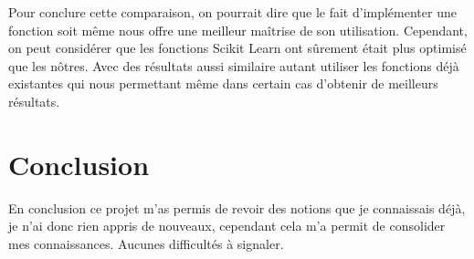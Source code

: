 \documentclass[french]{article}
\begin{document}
Pour conclure cette comparaison, on pourrait dire que le fait d'implémenter une fonction soit même nous offre une meilleur maîtrise de son utilisation. Cependant, on peut considérer que les fonctions Scikit Learn ont sûrement était plus optimisé que les nôtres. Avec des résultats aussi similaire autant utiliser les fonctions déjà existantes qui nous permettant même dans certain cas d'obtenir de meilleurs résultats.

\section{Conclusion}

En conclusion ce projet m'as permis de revoir des notions que je connaissais déjà, je n'ai donc rien appris de nouveaux, cependant cela m'a permit de consolider mes connaissances. Aucunes difficultés à signaler.
\end{document}
